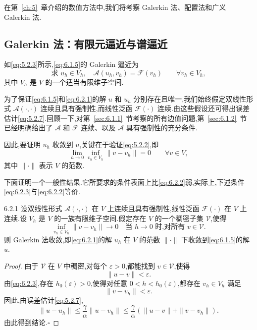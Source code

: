在第~\ref{ch:5}~章介绍的数值方法中,我们将考察 Galerkin 法、配置法和广义 Galerkin 法.

\subsection{Galerkin 法：有限元逼近与谱逼近}\label{sec:6.2.1}

如\eqref{eq:5.2.3}所示,\eqref{eq:6.1.5}的 Galerkin 逼近为
\begin{equation}\label{eq:6.2.1}
  \text{求 }u_h\in V_h,\quad \mathcal A(u_h,v_h)=\mathcal F(v_h)
    \qquad\forall v_h\in V_h,
\end{equation}
其中 \(V_h\) 是 \(V\) 的一个适当有限维子空间.

为了保证\eqref{eq:6.1.5}和\eqref{eq:6.2.1}的解 \(u\) 和 \(u_h\) 分别存在且唯一,我们始终假定双线性形式 \(\mathcal A(\cdot,\cdot)\) 连续且具有强制性,而线性泛函 \(\mathcal F(\cdot)\) 连续.由这些假设还可得出误差估计\eqref{eq:5.2.7}.回顾一下,对第~\ref{sec:6.1.1}~节考察的所有边值问题,第~\ref{sec:6.1.2}~节已经明确给出了 \(\mathcal A\) 和 \(\mathcal F\) 连续、以及 \(\mathcal A\) 具有强制性的充分条件.

因此,要证明 \(u_h\) 收敛到 \(u\),关键在于验证\eqref{eq:5.2.2},即
\begin{equation}\label{eq:6.2.2}
  \lim_{h\to0}\inf_{v_h\in V_h}\|v-v_h\|=0
  \qquad\forall v\in V,
\end{equation}
其中 \(\|\cdot\|\) 表示 \(V\) 的范数.

下面证明一个一般性结果.它所要求的条件表面上比\eqref{eq:6.2.2}弱,实际上,下述条件\eqref{eq:6.2.3}与\eqref{eq:6.2.2}等价.

\begin{proposition}[]{6.2.1}
设双线性形式 \(\mathcal A(\cdot,\cdot)\) 在 \(V\) 上连续且具有强制性,线性泛函 \(\mathcal F(\cdot)\) 在 \(V\) 上连续.设 \(V_h\) 是 \(V\) 的一族有限维子空间.假定存在 \(V\) 的一个稠密子集 \(\mathcal V\),使得
\begin{equation}\label{eq:6.2.3}
  \inf_{v_h\in V_h}\|v-v_h\|\longrightarrow0
      \quad\text{当 }h\to0\text{ 时,对所有 }v\in\mathcal V.
\end{equation}
则 Galerkin 法收敛,即\eqref{eq:6.2.1}的解 \(u_h\) 在 \(V\) 的范数 \(\|\cdot\|\) 下收敛到\eqref{eq:6.1.5}的解 \(u\).
\end{proposition}

\begin{proof}
由于 \(\mathcal V\) 在 \(V\) 中稠密,对每个 \(\varepsilon>0\),都能找到 \(v\in\mathcal V\),使得
\[
  \|u-v\|<\varepsilon.
\]
由\eqref{eq:6.2.3},存在 \(h_0(\varepsilon)>0\),使得对任意 \(0<h<h_0(\varepsilon)\),都存在 \(v_h\in V_h\) 满足
\[
  \|v-v_h\|<\varepsilon.
\]
因此,由误差估计\eqref{eq:5.2.7},
\[
  \|u-u_h\|\le\frac\gamma\alpha\|u-v_h\|
  \le\frac\gamma\alpha(\|u-v\|+\|v-v_h\|).
\]
由此得到结论.\hfill\(\square\)
\end{proof}

